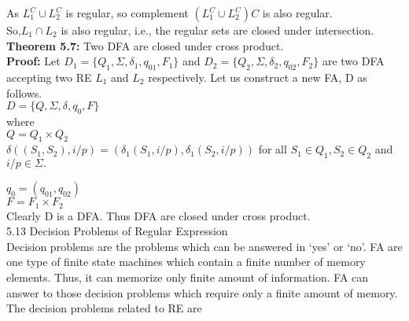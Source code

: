 \documentclass[8pt]{beamer}
\begin{document}
\begin{frame}
\hspace*{0.5cm} As $L_1^C \cup L_2^C$ is regular, so complement $(L_1^C \cup L_2^C)C$ is also regular.\\
\hspace*{0.5cm} So,$L_1\cap L_2$ is also regular, i.e., the regular sets are closed under intersection.\\

\vspace*{0.4cm}
\textbf{Theorem 5.7:} Two DFA are closed under cross product.\\

\vspace*{0.3cm}
\textbf{Proof:} Let $D_1 = \{Q_1, \Sigma , \delta_1, q_01, F_1\}$ and $D_2 = \{Q_2, \Sigma , \delta_2, q_02, F_2\}$ are two DFA accepting two RE $L_1$ and
$L_2$ respectively. Let us construct a new FA, D as follows.\\

\vspace*{0.3cm}
\hspace*{4cm} $D = \{Q, \Sigma , \delta , q_0, F\}$ \\

where\\

\hspace*{4cm} $Q = Q_1 \times Q_2$ \\
\small{
\hspace*{0.5cm} $\delta((S_1, S_2), i/p) = (\delta_1(S_1, i/p), \delta_1(S_2, i/p))$ for all $S_1 \in Q_1, S_2 \in Q_2$ and $i/p \in \Sigma.$ }\\

\end{frame}

\begin{frame}
\hspace*{4cm} $q_0 = (q_01, q_02)$ \\
\hspace*{4cm} $F = F_1 \times F_2$ \\

\vspace*{0.3cm}
Clearly D is a DFA. Thus DFA are closed under cross product.\\

\vspace*{0.4cm}
5.13 Decision Problems of Regular Expression\\

\vspace*{0.3cm}
Decision problems are the problems which can be answered in ‘yes’ or ‘no’. FA are one type of finite state
machines which contain a finite number of memory elements. Thus, it can memorize only finite amount
of information. FA can answer to those decision problems which require only a finite amount of memory.\\
\hspace*{0.5cm} The decision problems related to RE are\\

\vspace*{0.3cm}
\end{frame}
\end{document}
